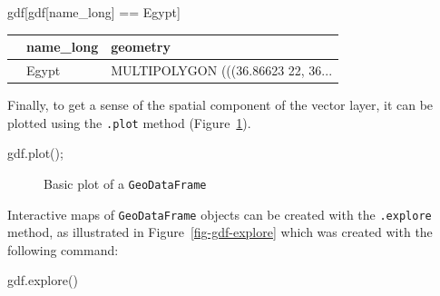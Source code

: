 \documentclass[
  letterpaper,
]{krantz}
\newenvironment{Shaded}{\begin{snugshade}}{\end{snugshade}}
\newcommand{\NormalTok}[1]{\textcolor[rgb]{0.00,0.23,0.31}{#1}}
\newcommand{\OperatorTok}[1]{\textcolor[rgb]{0.37,0.37,0.37}{#1}}
\newcommand{\StringTok}[1]{\textcolor[rgb]{0.13,0.47,0.30}{#1}}
\begin{document}
\begin{Shaded}
\begin{Highlighting}[]
\NormalTok{gdf[gdf[}\StringTok{\textquotesingle{}name\_long\textquotesingle{}}\NormalTok{] }\OperatorTok{==} \StringTok{\textquotesingle{}Egypt\textquotesingle{}}\NormalTok{]}
\end{Highlighting}
\end{Shaded}

\begin{longtable}[]{@{}lll@{}}
\toprule\noalign{}
& name\_long & geometry \\
\midrule\noalign{}
\endhead
\bottomrule\noalign{}
\endlastfoot
163 & Egypt & MULTIPOLYGON (((36.86623 22, 36... \\
\end{longtable}

Finally, to get a sense of the spatial component of the vector layer, it
can be plotted using the \texttt{.plot} method
(Figure~\ref{fig-gdf-plot}).

\begin{Shaded}
\begin{Highlighting}[]
\NormalTok{gdf.plot()}\OperatorTok{;}
\end{Highlighting}
\end{Shaded}

\begin{figure}[H]


\caption{\label{fig-gdf-plot}Basic plot of a \texttt{GeoDataFrame}}

\end{figure}%

Interactive maps of \texttt{GeoDataFrame} objects can be created with
the \texttt{.explore} method, as illustrated in
Figure~\ref{fig-gdf-explore} which was created with the following
command:

\begin{Shaded}
\begin{Highlighting}[]
\NormalTok{gdf.explore()}
\end{Highlighting}
\end{Shaded}
\end{document}
